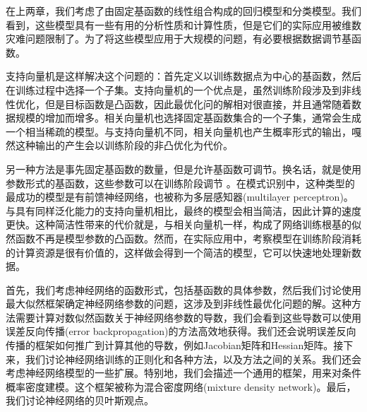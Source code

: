 在上两章，我们考虑了由固定基函数的线性组合构成的回归模型和分类模型。我们看到，这些模型具有一些有用的分析性质和计算性质，但是它们的实际应用被维数灾难问题限制了。为了将这些模型应用于大规模的问题，有必要根据数据调节基函数。

支持向量机是这样解决这个问题的：首先定义以训练数据点为中心的基函数，然后在训练过程中选择一个子集。支持向量机的一个优点是，虽然训练阶段涉及到非线性优化，但是目标函数是凸函数，因此最优化问的解相对很直接，并且通常随着数据规模的增加而增多。相关向量机也选择固定基函数集合的一个子集，通常会生成一个相当稀疏的模型。与支持向量机不同，相关向量机也产生概率形式的输出，嘎然这种输出的产生会以训练阶段的非凸优化为代价。

另一种方法是事先固定基函数的数量，但是允许基函数可调节。换名话，就是使用参数形式的基函数，这些参数可以在训练阶段调节 。在模式识别中，这种类型的最成功的模型是有前馈神经网络，也被称为多层感知器(multilayer perceptron)。与具有同样泛化能力的支持向量机相比，最终的模型会相当简洁，因此计算的速度更快。这种简洁性带来的代价就是，与相关向量机一样，构成了网络训练根基的似然函数不再是模型参数的凸函数。然而，在实际应用中，考察模型在训练阶段消耗的计算资源是很有价值的，这样做会得到一个简洁的模型，它可以快速地处理新数据。

首先，我们考虑神经网络的函数形式，包括基函数的具体参数，然后我们讨论使用最大似然框架确定神经网络参数的问题，这涉及到非线性最优化问题的解。这种方法需要计算对数似然函数关于神经网络参数的导数，我们会看到这些导数可以使用误差反向传播(error backpropagation)的方法高效地获得。我们还会说明误差反向传播的框架如何推广到计算其他的导数，例如Jacobian矩阵和Hessian矩阵。接下来，我们讨论神经网络训练的正则化和各种方法，以及方法之间的关系。我们还会考虑神经网络模型的一些扩展。特别地，我们会描述一个通用的框架，用来对条件概率密度建模。这个框架被称为混合密度网络(mixture density network)。最后，我们讨论神经网络的贝叶斯观点。